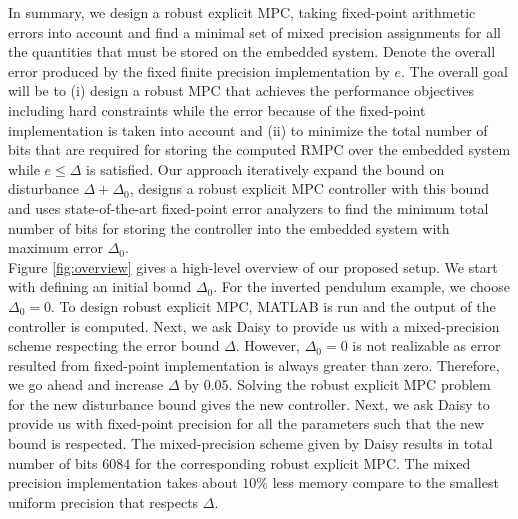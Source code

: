 	In summary, we design a robust explicit MPC, taking fixed-point arithmetic errors into account and find a minimal set of mixed precision assignments for all the quantities that must be stored on the embedded system. Denote the overall error produced by the fixed finite precision implementation by $e$.
   The overall goal will be to (i) design a robust MPC that achieves the performance objectives including hard constraints while the error because of the fixed-point implementation is taken into account and (ii) to minimize the total number of bits that are required for storing the computed RMPC over the embedded system while $e\leq \Delta$ is satisfied.
	Our approach iteratively expand the bound on disturbance $\Delta+\Delta_0$, designs a robust explicit MPC controller with this bound and uses state-of-the-art fixed-point error analyzers to find the minimum total number of bits for storing the controller into the embedded system with maximum error $\Delta_0$.\\
	
	Figure \ref{fig:overview} gives a high-level overview of our proposed setup. 
	We start with defining an initial bound $\Delta_0$. For the inverted pendulum example, we choose $\Delta_0=0$. To design robust explicit MPC, MATLAB is run and the output of the controller is computed. Next, we ask Daisy to provide us with a mixed-precision scheme respecting the error bound $\Delta$. However, $\Delta_0=0$ is not realizable as error resulted from fixed-point implementation is always greater than zero. Therefore, we go ahead and increase $\Delta$ by $0.05$. Solving the robust explicit MPC problem for the new disturbance bound gives the new controller. Next, we ask Daisy to provide us with fixed-point precision for all the parameters such that the new bound is respected. The mixed-precision scheme given by Daisy results in total number of bits $6084$ for the corresponding robust explicit MPC. The mixed precision implementation takes about $10\%$ less memory compare to the smallest uniform precision that respects $\Delta$. 
	
